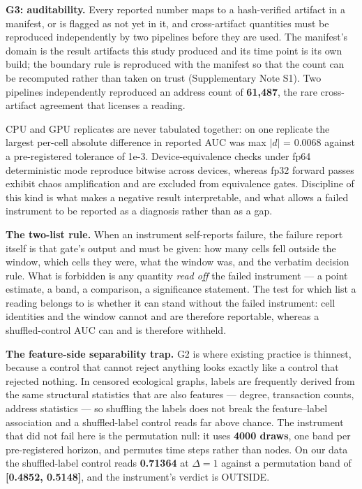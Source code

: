 \textbf{G3: auditability.} Every reported number maps to a hash-verified
artifact in a manifest, or is flagged as not yet in it, and cross-artifact
quantities must be reproduced independently by two pipelines before they are
used. The manifest's domain is the result artifacts this study produced and its
time point is its own build; the boundary rule is reproduced with the manifest so
that the count can be recomputed rather than taken on trust (Supplementary Note
S1). Two pipelines independently reproduced an address count of
\textbf{61,487}, the rare cross-artifact agreement that licenses a reading.

CPU and GPU replicates are never tabulated together: on one replicate the
largest per-cell absolute difference in reported AUC was max $|d|$ = 0.0068
against a pre-registered tolerance of 1e-3. Device-equivalence checks under fp64
deterministic mode reproduce bitwise across devices, whereas fp32 forward passes
exhibit chaos amplification and are excluded from equivalence gates. Discipline
of this kind is what makes a negative result interpretable, and what allows a
failed instrument to be reported as a diagnosis rather than as a gap.

\textbf{The two-list rule.} When an instrument self-reports failure, the failure
report itself is that gate's output and must be given: how many cells fell
outside the window, which cells they were, what the window was, and the verbatim
decision rule. What is forbidden is any quantity \emph{read off} the failed
instrument --- a point estimate, a band, a comparison, a significance statement.
The test for which list a reading belongs to is whether it can stand without the
failed instrument: cell identities and the window cannot and are therefore
reportable, whereas a shuffled-control AUC can and is therefore withheld.

\textbf{The feature-side separability trap.} G2 is where existing practice is
thinnest, because a control that cannot reject anything looks exactly like a
control that rejected nothing. In censored ecological graphs, labels are
frequently derived from the same structural statistics that are also features ---
degree, transaction counts, address statistics --- so shuffling the labels does
not break the feature--label association and a shuffled-label control reads far
above chance. The instrument that did not fail here is the permutation null: it
uses \textbf{4000 draws}, one band per pre-registered horizon, and permutes time
steps rather than nodes. On our data the shuffled-label control reads
\textbf{0.71364} at $\Delta = 1$ against a permutation band of
\textbf{[0.4852, 0.5148]}, and the instrument's verdict is OUTSIDE.

